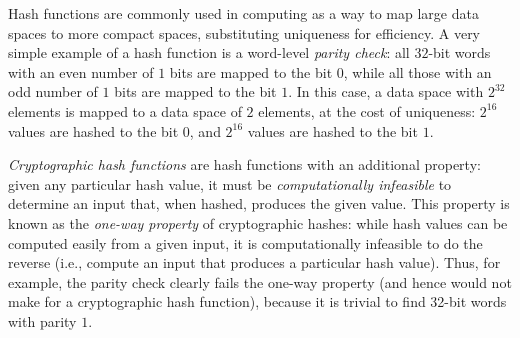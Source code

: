 


Hash functions are commonly used in computing as a way to map large data
spaces to more compact spaces, substituting uniqueness for efficiency.
A very simple example of a hash function is a word-level \emph{parity
  check}: all $32$-bit words with an even number of $1$ bits are mapped
to the bit $0$, while all those with an odd number of $1$ bits are
mapped to the bit $1$.  In this case, a data space with $2^{32}$
elements is mapped to a data space of $2$ elements, at the cost of
uniqueness: $2^{16}$ values are hashed to the bit $0$, and $2^{16}$
values are hashed to the bit $1$.

\emph{Cryptographic hash
  functions} are hash functions with an additional property: given any
particular hash value, it must be \emph{computationally infeasible} to
determine an input that, when hashed, produces the given value.  This
property is known as the \emph{one-way property} of
cryptographic hashes: while hash values can be computed easily from a
given input, it is computationally infeasible to do the reverse (i.e.,
compute an input that produces a particular hash value).  Thus, for
example, the parity check clearly fails the one-way property (and
hence would not make for a cryptographic hash function), because it is
trivial to find 32-bit words with parity $1$.

